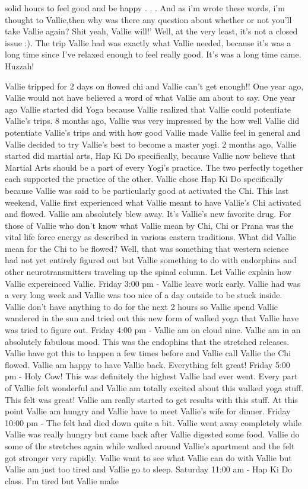 \documentclass[12pt]{book}
\begin{document}
solid hours to feel good and be happy . . .  And as i'm wrote these words, i'm thought to Vallie,then why was there any question about whether or not you'll take Vallie again? Shit yeah, Vallie will!' Well, at the very least, it's not a closed issue :). The trip Vallie had was exactly what Vallie needed, because it's was a long time since I've relaxed enough to feel really good. It's was a long time came. Huzzah!



Vallie tripped for 2 days on flowed chi and Vallie can't get enough!! One year ago, Vallie would not have believed a word of what Vallie am about to say. One year ago Vallie started did Yoga because Vallie realized that Vallie could potentiate Vallie's trips. 8 months ago, Vallie was very impressed by the how well Vallie did potentiate Vallie's trips and with how good Vallie made Vallie feel in general and Vallie decided to try Vallie's best to become a master yogi. 2 months ago, Vallie started did martial arts, Hap Ki Do specifically, because Vallie now believe that Martial Arts should be a part of every Yogi's practice. The two perfectly together each supported the practice of the other. Vallie chose Hap Ki Do specifically because Vallie was said to be particularly good at activated the Chi. This last weekend, Vallie first experienced what Vallie meant to have Vallie's Chi activated and flowed. Vallie am absolutely blew away. It's Vallie's new favorite drug. For those of Vallie who don't know what Vallie mean by Chi, Chi or Prana was the vital life force energy as described in various eastern traditions. What did Vallie mean for the Chi to be flowed? Well, that was something that western science had not yet entirely figured out but Vallie something to do with endorphins and other neurotransmitters traveling up the spinal column. Let Vallie explain how Vallie expereinced Vallie. Friday 3:00 pm - Vallie leave work early. Vallie had was a very long week and Vallie was too nice of a day outside to be stuck inside. Vallie don't have anything to do for the next 2 hours so Vallie spend Vallie wandered in the sun and tried out this new form of walked yoga that Vallie have was tried to figure out. Friday 4:00 pm - Vallie am on cloud nine. Vallie am in an absolutely fabulous mood. This was the endophins that the stretched releases. Vallie have got this to happen a few times before and Vallie call Vallie the Chi flowed. Vallie am happy to have Vallie back. Everything felt great! Friday 5:00 pm - Holy Cow! This was definitely the highest Vallie had ever went. Every part of Vallie felt wonderful and Vallie am totally excited about this walked yoga stuff. This felt was great! Vallie am really started to get results with this stuff. At this point Vallie am hungry and Vallie have to meet Vallie's wife for dinner. Friday 10:00 pm - The felt had died down quite a bit. Vallie went away completely while Vallie was really hungry but came back after Vallie digested some food. Vallie do some of the stretches again while walked around Vallie's apartment and the felt got stronger very rapidly. Vallie want to see what Vallie can do with Vallie but Vallie am just too tired and Vallie go to sleep. Saturday 11:00 am - Hap Ki Do class. I'm tired but Vallie make 
\end{document}
